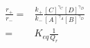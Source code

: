 \begin{eqnarray}
\frac{r_+}{r_-}  = &\frac{k_+}{k_-}\frac{[C]^{\gamma_C}[D]^{\gamma_D}}{[A]^{\gamma_A}[B]^{\gamma_D}} \\
 = & K_{eq}\frac{1}{Q_r} \\
\end{eqnarray}